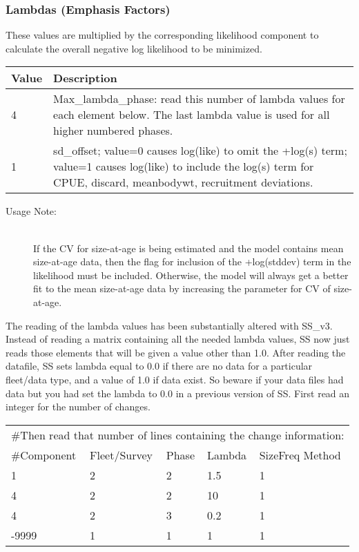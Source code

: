 \subsubsection{Lambdas (Emphasis Factors)}
These values are multiplied by the corresponding likelihood component to calculate the overall negative log likelihood to be minimized.

\begin{center}
	\begin{tabular}{p{2cm} p{14cm}}
		Value & Description \\
		\hline
		4 & Max\_lambda\_phase: read this number of lambda values for each element below.  The last lambda value is used for all higher numbered phases.\\
		1 & sd\_offset; value=0 causes log(like) to omit the +log(s) term; value=1 causes log(like) to include the log(s) term for CPUE, discard, meanbodywt, recruitment deviations. \\
		\hline
	\end{tabular}
\end{center}

\begin{description}
	\item[Usage Note:]\hfil\\
	If the CV for size-at-age is being estimated and the model contains mean size-at-age data, then the flag for inclusion of the +log(stddev) term in the likelihood must be included.  Otherwise, the model will always get a better fit to the mean size-at-age data by increasing the parameter for CV of size-at-age.
\end{description}

The reading of the lambda values has been substantially altered with SS\_v3.  Instead of reading a matrix containing all the needed lambda values, SS now just reads those elements that will be given a value other than 1.0.  After reading the datafile, SS sets lambda equal to 0.0 if there are no data for a particular fleet/data type, and a value of 1.0 if data exist.  So beware if your data files had data but you had set the lambda to 0.0 in a previous version of SS.  First read an integer for the number of changes.

\begin{center}
	\begin{longtable}{p{3cm} p{3cm} p{2cm} p{3cm} p{3cm}}
		\hline
		\multicolumn{5}{l}{\#Then read that number of lines containing the change information:}\\
		\#Component & Fleet/Survey & Phase & Lambda & SizeFreq Method \\
		\hline
		1 & 2 & 2 & 1.5 & 1 \\
		4 & 2 & 2 & 10 & 1 \\
		4 & 2 & 3 & 0.2 & 1 \\
		-9999 & 1 & 1 & 1 & 1 \\
		\hline
	\end{longtable}
\end{center}

